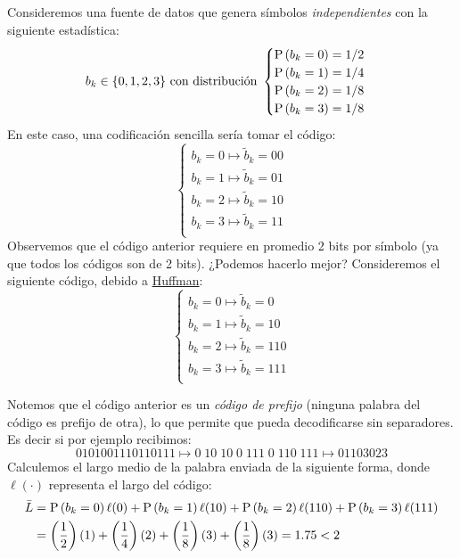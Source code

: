 \begin{ejemplo}\label{ej:lossless}
Consideremos una fuente de datos que genera símbolos \emph{independientes} con la siguiente estadística:
\begin{equation*}
    b_k \in \{0,1,2,3\} \text{ con distribución } \begin{cases}
    \mathrm{P}\left(b_k=0\right) = 1/2 \\
    \mathrm{P}\left(b_k=1\right) = 1/4 \\
    \mathrm{P}\left(b_k=2\right) = 1/8 \\
    \mathrm{P}\left(b_k=3\right) = 1/8 \\
    \end{cases}
\end{equation*}
En este caso, una codificación sencilla sería tomar el código:
\begin{equation*}
    \begin{cases}
        b_k = 0 \mapsto \tilde{b}_k = 00 \\
        b_k = 1 \mapsto \tilde{b}_k = 01 \\
        b_k = 2 \mapsto \tilde{b}_k = 10 \\
        b_k = 3 \mapsto \tilde{b}_k = 11 \\
    \end{cases}
\end{equation*}
Observemos que el código anterior requiere en promedio 2 bits por símbolo (ya que todos los códigos son de 2 bits). ¿Podemos hacerlo mejor? Consideremos el siguiente código, debido a \href{https://en.wikipedia.org/wiki/Huffman_coding}{Huffman}:
\begin{equation*}
    \begin{cases}
        b_k = 0 \mapsto \tilde{b}_k = 0 \\
        b_k = 1 \mapsto \tilde{b}_k = 10 \\
        b_k = 2 \mapsto \tilde{b}_k = 110 \\
        b_k = 3 \mapsto \tilde{b}_k = 111 \\
    \end{cases}
\end{equation*}

Notemos que el código anterior es un \emph{código de prefijo} (ninguna palabra del código es prefijo de otra), lo que permite que pueda decodificarse sin separadores. Es decir si por ejemplo recibimos:
\begin{equation*}
    0101001110110111 \mapsto 0\;10\;10\;0\;111\;0\;110\;111 \mapsto 01103023
\end{equation*}
Calculemos el largo medio de la palabra enviada de la siguiente forma, donde $\ell(\cdot)$ representa el largo del código:
\begin{align*}
    \bar{L} &= \mathrm{P}\left(b_k=0\right) \ell(0) + \mathrm{P}\left(b_k=1\right) \ell(10) + \mathrm{P}\left(b_k=2\right) \ell(110) + \mathrm{P}\left(b_k=3\right) \ell(111)\\
    &= \left(\frac{1}{2}\right)(1) + \left(\frac{1}{4}\right)(2) + \left(\frac{1}{8}\right)(3) + \left(\frac{1}{8}\right)(3) = 1.75 < 2
\end{align*}


\end{ejemplo}
